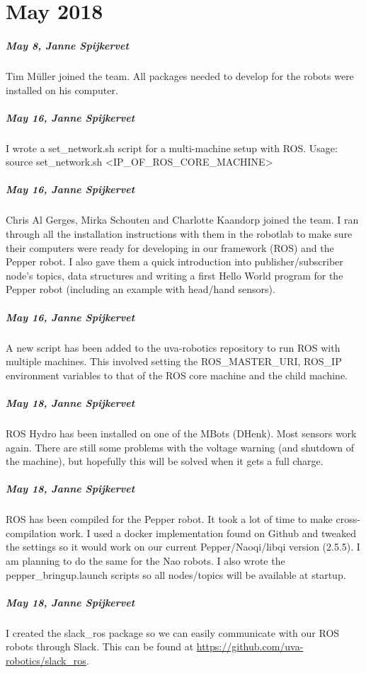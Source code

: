 
\chapter{May 2018}
\label{ch:may-2018}


\paragraph{May 8, Janne Spijkervet}
Tim Müller joined the team. All packages needed to develop for the robots were installed on his computer.

\paragraph{May 16, Janne Spijkervet}
I wrote a set\_network.sh script for a multi-machine setup with ROS. Usage: source set\_network.sh <IP\_OF\_ROS\_CORE\_MACHINE>

\paragraph{May 16, Janne Spijkervet}
Chris Al Gerges, Mirka Schouten and Charlotte Kaandorp joined the team. I ran through all the installation instructions with them in the robotlab to make sure their computers were ready for developing in our framework (ROS) and the Pepper robot. I also gave them a quick introduction into publisher/subscriber node's topics, data structures and writing a first Hello World program for the Pepper robot (including an example with head/hand sensors).

\paragraph{May 16, Janne Spijkervet}
A new script has been added to the uva-robotics repository to run ROS with multiple machines. This involved setting the ROS\_MASTER\_URI, ROS\_IP environment variables to that of the ROS core machine and the child machine.

\paragraph{May 18, Janne Spijkervet}
ROS Hydro has been installed on one of the MBots (DHenk). Most sensors work again. There are still some problems with the voltage warning (and shutdown of the machine), but hopefully this will be solved when it gets a full charge.

\paragraph{May 18, Janne Spijkervet}
ROS has been compiled for the Pepper robot. It took a lot of time to make cross-compilation work. I used a docker implementation found on Github and tweaked the settings so it would work on our current Pepper/Naoqi/libqi version (2.5.5). I am planning to do the same for the Nao robots. I also wrote the pepper\_bringup.launch scripts so all nodes/topics will be available at startup.

\paragraph{May 18, Janne Spijkervet}
I created the slack\_ros package so we can easily communicate with our ROS robots through Slack. This can be found at \url{https://github.com/uva-robotics/slack_ros}.


\bigskip
